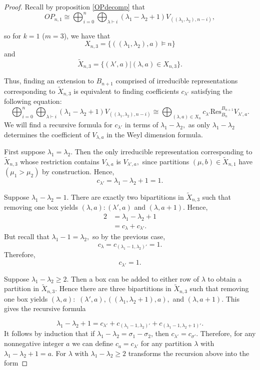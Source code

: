 \documentclass{amsart}
\theoremstyle{plain}
\theoremstyle{definition}
\begin{document}
\begin{proof}
Recall by proposition \ref{OPdecomp} that 
$$  
         OP_{n,1}\cong \bigoplus_{i=0}^n \bigoplus_{\lambda \vdash i} (\lambda_1 - \lambda_2 + 1)V_{((\lambda_1, \lambda_2),n-i)}, 
   $$

so for  $k=1 $ ($m=3$), we have that 
$$X_{n,3}=\{ ((\lambda_1,\lambda_2),a)\vDash n \}$$ 
and 
$$\tilde X_{n,3}= \{(\lambda',a)| (\lambda,a)\in X_{n,3}\}.$$

 Thus, finding an extension to $B_{n+1}$ comprised of irreducible representations corresponding to $\tilde X_{n,3}$ is equivalent to finding coefficients  $c_{\lambda' }$ satisfying the following equation:
\begin{equation}\label{eq: extension problem for OPn1}
    \bigoplus_{i=0}^n \bigoplus_{\lambda \vdash i} (\lambda_1 - \lambda_2 + 1)V_{((\lambda_1, \lambda_2),n-i)} \cong \bigoplus_{(\lambda, a) \in X_n} c_{\lambda'}\mathrm{Res}_{B_n}^{B_{n+1}} V_{\lambda',a}.
\end{equation}   
We will find a recursive formula for $c_{\lambda'}$ in terms of $\lambda_1-\lambda_2,$ as only $\lambda_1-\lambda_2$ determines the coefficient of $V_{\lambda,a}$ in the Weyl dimension formula. 


First suppose $\lambda_1=\lambda_2.$ Then the only irreducible representation corresponding to  $\tilde{X}_{n,3}$ whose restriction contains $V_{\lambda,a}$ is $V_{\lambda',a},$ since partitions  $(\mu,b)\in \tilde X_{n,1}$ have $(\mu_1>\mu_2)$ by construction. Hence, $$c_{\lambda'}= \lambda_1-\lambda_2+1=1.$$

Suppose $\lambda_1-\lambda_2=1.$ There are exactly two bipartitions in $\tilde X_{n,3}$ such that removing one box yields $(\lambda,a): (\lambda',a)$ and $(\lambda,a+1).$ Hence, 
\begin{align*}
    2 &= \lambda_1-\lambda_2+1\\
    &= c_{\lambda}+c_{\lambda'}.
\end{align*}
But recall that $\lambda_1-1=\lambda_2,$ so by the previous case,
$$ c_{\lambda}= c_{(\lambda_1-1,\lambda_2)'}=1.$$ Therefore, 
$$c_{\lambda'}=1.$$ 

Suppose $\lambda_1-\lambda_2\ge 2.$ Then a box can be added to either row of $\lambda$ to obtain a partition in $\tilde X_{n,3}.$ Hence there are three bipartitions in $\tilde X_{n,3}$ such that removing one box yields $(\lambda,a):$ $(\lambda',a), ((\lambda_1,\lambda_2+1),a),$ and $(\lambda,a+1).$ This gives the recursive formula  

\begin{equation} 
\lambda_1-\lambda_2 +1 = c_{\lambda'}+ c_{(\lambda_1-1,\lambda_2)'} + c_{(\lambda_1-1,\lambda_2+1)'} .
\label{eq:recursion}
\end{equation}
 It follows by induction that if $\lambda_1-\lambda_2=\sigma_1-\sigma_2$, then $c_{\lambda'}=c_{\sigma'}.$ Therefore, for any nonnegative integer $a$ we can define $c_a=c_{\lambda'}$ for any partition $\lambda$ with $\lambda_1-\lambda_2+1=a. $ For $\lambda$ with $\lambda_1-\lambda_2\ge 2$ transforms the recursion above into the form 


\end{proof}
\end{document}
